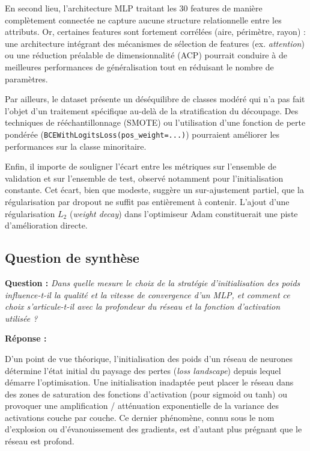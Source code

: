 \documentclass[11pt,a4paper]{article}
\begin{document}
En second lieu, l'architecture MLP traitant les 30 features de manière complètement
connectée ne capture aucune structure relationnelle entre les attributs. Or, certaines
features sont fortement corrélées (aire, périmètre, rayon) : une architecture intégrant
des mécanismes de sélection de features (ex. \textit{attention}) ou une réduction
préalable de dimensionnalité (ACP) pourrait conduire à de meilleures performances de
généralisation tout en réduisant le nombre de paramètres.

Par ailleurs, le dataset présente un déséquilibre de classes modéré qui n'a pas fait
l'objet d'un traitement spécifique au-delà de la stratification du découpage.
Des techniques de rééchantillonnage (SMOTE) ou l'utilisation d'une fonction de perte
pondérée (\texttt{BCEWithLogitsLoss(pos\_weight=...)}) pourraient améliorer les
performances sur la classe minoritaire.

Enfin, il importe de souligner l'écart entre les métriques sur l'ensemble de validation
et sur l'ensemble de test, observé notamment pour l'initialisation constante. Cet écart,
bien que modeste, suggère un sur-ajustement partiel, que la régularisation par dropout
ne suffit pas entièrement à contenir. L'ajout d'une régularisation $L_2$ (\textit{weight
decay}) dans l'optimiseur Adam constituerait une piste d'amélioration directe.

\subsection{Question de synthèse}

\textbf{Question :} \textit{Dans quelle mesure le choix de la stratégie d'initialisation
des poids influence-t-il la qualité et la vitesse de convergence d'un MLP, et comment
ce choix s'articule-t-il avec la profondeur du réseau et la fonction d'activation
utilisée ?}

\textbf{Réponse :}

D'un point de vue théorique, l'initialisation des poids d'un réseau de neurones détermine
l'état initial du paysage des pertes (\textit{loss landscape}) depuis lequel démarre
l'optimisation. Une initialisation inadaptée peut placer le réseau dans des zones de
saturation des fonctions d'activation (pour sigmoid ou tanh) ou provoquer une
amplification / atténuation exponentielle de la variance des activations couche par couche.
Ce dernier phénomène, connu sous le nom d'explosion ou d'évanouissement des gradients,
est d'autant plus prégnant que le réseau est profond.
\end{document}
